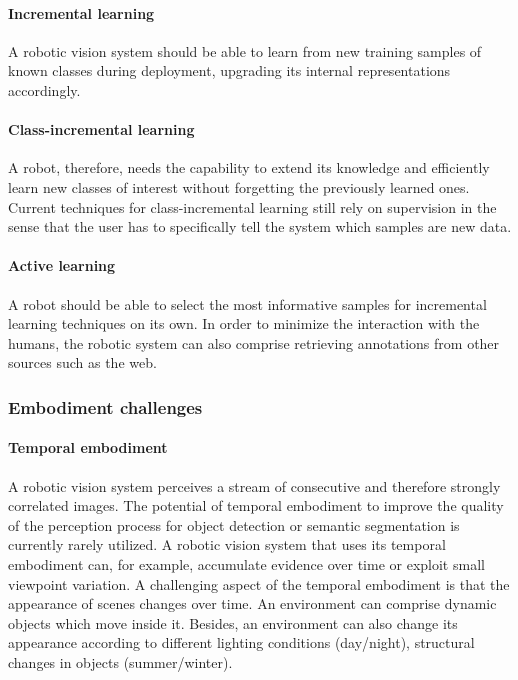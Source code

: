 \paragraph{Incremental learning}

A robotic vision system should be able to learn from new training
samples of known classes during deployment, upgrading its internal
representations accordingly.

\paragraph{Class-incremental learning}

A robot, therefore, needs the capability to extend its knowledge and
efficiently learn new classes of interest without forgetting the
previously learned ones. Current techniques for class-incremental
learning still rely on supervision in the sense that the user has to
specifically tell the system which samples are new data.

\paragraph{Active learning}

A robot should be able to select the most informative samples for
incremental learning techniques on its own. In order to minimize the
interaction with the humans, the robotic system can also comprise
retrieving annotations from other sources such as the web.

\newpage
\subsubsection{Embodiment challenges}\label{header-n24}

\paragraph{Temporal embodiment}

A robotic vision system perceives a stream of consecutive and therefore
strongly correlated images. The potential of temporal embodiment to
improve the quality of the perception process for object detection or
semantic segmentation is currently rarely utilized. A robotic vision
system that uses its temporal embodiment can, for example, accumulate
evidence over time or exploit small viewpoint variation. A challenging
aspect of the temporal embodiment is that the appearance of scenes
changes over time. An environment can comprise dynamic objects which
move inside it. Besides, an environment can also change its appearance
according to different lighting conditions (day/night), structural
changes in objects (summer/winter).

